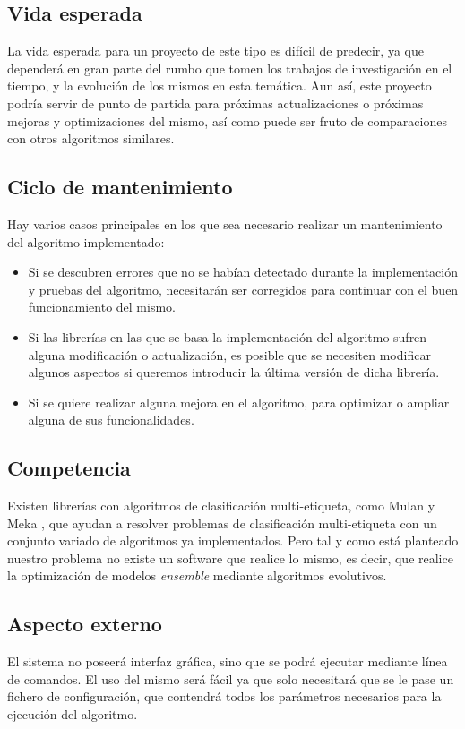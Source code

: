 \subsection{Vida esperada}
La vida esperada para un proyecto de este tipo es difícil de predecir, ya que dependerá en gran parte del rumbo que tomen los trabajos de investigación en el tiempo, y la evolución de los mismos en esta temática. Aun así, este proyecto podría servir de punto de partida para próximas actualizaciones o próximas mejoras y optimizaciones del mismo, así como puede ser fruto de comparaciones con otros algoritmos similares.

\subsection{Ciclo de mantenimiento}
Hay varios casos principales en los que sea necesario realizar un mantenimiento del algoritmo implementado:

\begin{itemize}
	\item Si se descubren errores que no se habían detectado durante la implementación y pruebas del algoritmo, necesitarán ser corregidos para continuar con el buen funcionamiento del mismo.
	\item Si las librerías en las que se basa la implementación del algoritmo sufren alguna modificación o actualización, es posible que se necesiten modificar algunos aspectos si queremos introducir la última versión de dicha librería.
	\item Si se quiere realizar alguna mejora en el algoritmo, para optimizar o ampliar alguna de sus funcionalidades.
\end{itemize}

\subsection{Competencia}
Existen librerías con algoritmos de clasificación multi-etiqueta, como Mulan \cite{WebMulan} y Meka \cite{WebMeka},  que ayudan a resolver problemas de clasificación multi-etiqueta con un conjunto variado de algoritmos ya implementados. Pero tal y como está planteado nuestro problema no existe un software que realice lo mismo, es decir, que realice la optimización de modelos \textit{ensemble} mediante algoritmos evolutivos.

\subsection{Aspecto externo}
El sistema no poseerá interfaz gráfica, sino que se podrá ejecutar mediante línea de comandos. El uso del mismo será fácil ya que solo necesitará que se le pase un fichero de configuración, que contendrá todos los parámetros necesarios para la ejecución del algoritmo.

